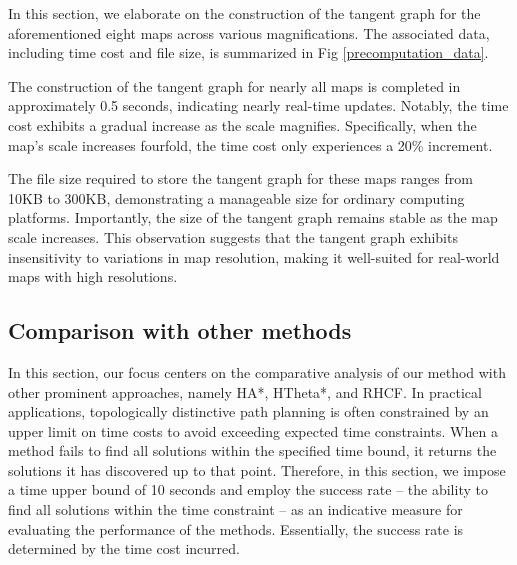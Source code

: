 \documentclass[lettersize,journal]{IEEEtran}
\begin{document}
In this section, we elaborate on the construction of the tangent graph for the aforementioned eight maps across various magnifications. The associated data, including time cost and file size, is summarized in Fig \ref{precomputation_data}.

The construction of the tangent graph for nearly all maps is completed in approximately 0.5 seconds, indicating nearly real-time updates. Notably, the time cost exhibits a gradual increase as the scale magnifies. Specifically, when the map's scale increases fourfold, the time cost only experiences a 20\% increment.

The file size required to store the tangent graph for these maps ranges from 10KB to 300KB, demonstrating a manageable size for ordinary computing platforms. Importantly, the size of the tangent graph remains stable as the map scale increases. This observation suggests that the tangent graph exhibits insensitivity to variations in map resolution, making it well-suited for real-world maps with high resolutions.


\subsection{Comparison with other methods}

    
In this section, our focus centers on the comparative analysis of our method with other prominent approaches, namely HA*, HTheta*, and RHCF. In practical applications, topologically distinctive path planning is often constrained by an upper limit on time costs to avoid exceeding expected time constraints. When a method fails to find all solutions within the specified time bound, it returns the solutions it has discovered up to that point. Therefore, in this section, we impose a time upper bound of 10 seconds and employ the success rate – the ability to find all solutions within the time constraint – as an indicative measure for evaluating the performance of the methods. Essentially, the success rate is determined by the time cost incurred.
\end{document}
